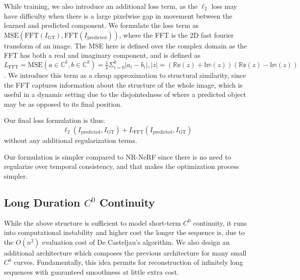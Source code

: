 While training, we also introduce an additional loss term, as the $\ell_2$ loss may have
difficulty when there is a large pixelwise gap in movement between the learned and predicted
component. We formulate the loss term as $\text{MSE}(\text{FFT}(I_\text{GT}),
\text{FFT}(I_\text{predicted}))$, where the FFT is the 2D fast fourier transform of an image.
The MSE here is defined over the complex domain as the FFT has both a real and imaginary
component, and is defined as $L_\text{FFT} =\text{MSE}(a\in\mathbb{C}^k,b\in\mathbb{C}^k) =
\frac{1}{k}\Sigma_{i=0}^k|a_i-b_i|, |z| = (\mathbb{Re}(z)+\mathbb{Im}(z))(\mathbb{Re}(z)-\mathbb{Im}(z))$.
We introduce this term as a cheap approximation to structural similarity, since the FFT captures
information about the structure of the whole image, which is useful in a dynamic setting due to
the disjointedness of where a predicted object may be as opposed to its final position.

Our final loss formulation is thus:
\[ \ell_2(I_\text{predicted}, I_\text{GT}) + L_\text{FFT}(I_\text{predicted}, I_\text{GT}) \]
without any additional regularization terms.

Our formulation is simpler compared to NR-NeRF since there is no need to regularize over
temporal consistency, and that makes the optimization process simpler.

\subsection{Long Duration $C^0$ Continuity}

While the above structure is sufficient to model short-term $C^0$ continuity, it runs into
computational instability and higher cost the longer the sequence is, due to the $O(n^2)$
evaluation cost of De Casteljau's algorithm. We also design an additional architecture which
composes the previous architecture for many small $C^0$ curves. Fundamentally, this idea permits
for reconstruction of infinitely long sequences with guaranteed smoothness at little extra cost.

